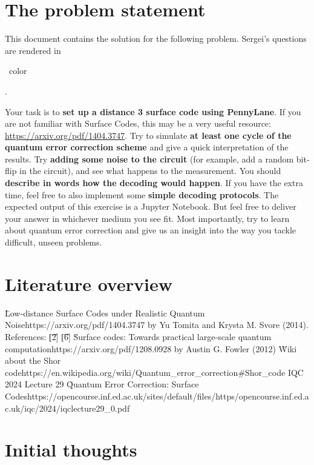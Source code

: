 \section{The problem statement}

This document contains the solution for the following problem. Sergei's questions are rendered in
\begin{\QuestionColor}\QuestionColorName\ color\end{\QuestionColor}.

\vsp

Your task is to \textbf{set up a distance 3 surface code using PennyLane}. If you are not familiar
with Surface Codes, this may be a very useful resource: \url{https://arxiv.org/pdf/1404.3747}. Try
to simulate \textbf{at least one cycle of the quantum error correction scheme} and give a quick
interpretation of the results. Try \textbf{adding some noise to the circuit} (for example, add a
random bit-flip in the circuit), and see what happens to the measurement. You should
\textbf{describe in words how the decoding would happen}. If you have the extra time, feel free to
also implement some \textbf{simple decoding protocols}. The expected output of this exercise is a
Jupyter Notebook. But feel free to deliver your answer in whichever medium you see fit. Most
importantly, try to learn about quantum error correction and give us an insight into the way you
tackle difficult, unseen problems.


\section{Literature overview}

\ls \u{Low-distance Surface Codes under Realistic Quantum Noise}{https://arxiv.org/pdf/1404.3747}
    by Yu Tomita and Krysta M. Svore (2014). References:
    \ls \t{[2]} 
    \li \t{[6]} \u{Surface codes: Towards practical large-scale quantum computation}{https://arxiv.org/pdf/1208.0928}
        by Austin G. Fowler (2012)
    \le
\li \u{Wiki about the Shor code}{https://en.wikipedia.org/wiki/Quantum_error_correction\#Shor_code}
\li IQC 2024 Lecture 29 \u{Quantum Error Correction: Surface Codes}{https://opencourse.inf.ed.ac.uk/sites/default/files/https/opencourse.inf.ed.ac.uk/iqc/2024/iqclecture29_0.pdf}
\li {}
\le



\section{Initial thoughts}

